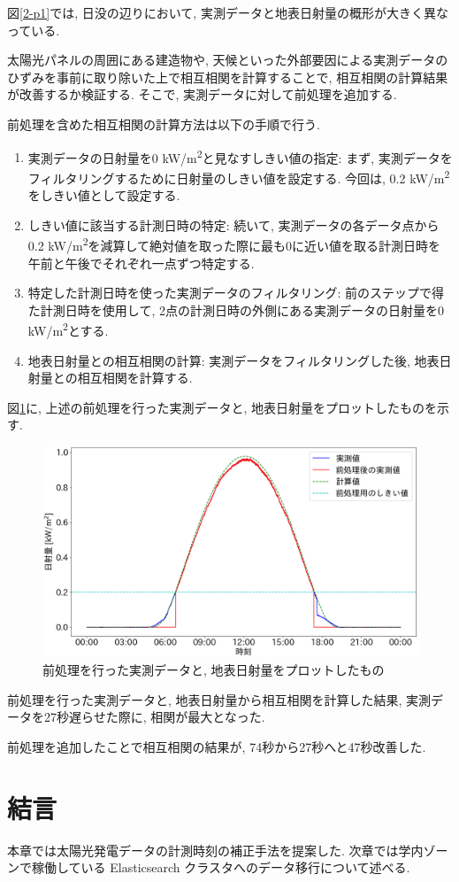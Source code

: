 図\ref{2-p1}では, 日没の辺りにおいて, 実測データと地表日射量の概形が大きく異なっている.

太陽光パネルの周囲にある建造物や, 天候といった外部要因による実測データのひずみを事前に取り除いた上で相互相関を計算することで, 相互相関の計算結果が改善するか検証する. そこで, 実測データに対して前処理を追加する.

前処理を含めた相互相関の計算方法は以下の手順で行う.

\begin{enumerate}
  \item 実測データの日射量を0 \si{\kilo\watt}/\si{\metre\squared}と見なすしきい値の指定: まず, 実測データをフィルタリングするために日射量のしきい値を設定する. 今回は, 0.2 \si{\kilo\watt}/\si{\metre\squared}をしきい値として設定する.
  \item しきい値に該当する計測日時の特定: 続いて, 実測データの各データ点から0.2 \si{\kilo\watt}/\si{\metre\squared}を減算して絶対値を取った際に最も0に近い値を取る計測日時を午前と午後でそれぞれ一点ずつ特定する.
  \item 特定した計測日時を使った実測データのフィルタリング: 前のステップで得た計測日時を使用して, 2点の計測日時の外側にある実測データの日射量を0 \si{\kilo\watt}/\si{\metre\squared}とする.
  \item 地表日射量との相互相関の計算: 実測データをフィルタリングした後, 地表日射量との相互相関を計算する.
\end{enumerate}

図\ref{2-p2}に, 上述の前処理を行った実測データと, 地表日射量をプロットしたものを示す.

\clearpage

\begin{figure}[h]
  \begin{center}
    \includegraphics[width=140mm]{sotu/figure/2/drop-under-0.2-q.png}
    \caption{前処理を行った実測データと, 地表日射量をプロットしたもの}
    \label{2-p2}
  \end{center}
\end{figure}

前処理を行った実測データと, 地表日射量から相互相関を計算した結果, 実測データを27秒遅らせた際に, 相関が最大となった.

前処理を追加したことで相互相関の結果が, 74秒から27秒へと47秒改善した.

\section{結言}
本章では太陽光発電データの計測時刻の補正手法を提案した.
次章では学内ゾーンで稼働している Elasticsearch クラスタへのデータ移行について述べる.